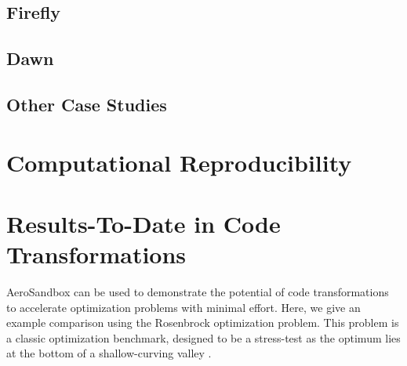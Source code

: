 
\subsection{Firefly} %

\subsection{Dawn} %

\subsection{Other Case Studies} %


\section{Computational Reproducibility}
\label{sec:asb-reproducibility}


\section{Results-To-Date in Code Transformations}



AeroSandbox can be used to demonstrate the potential of code transformations to accelerate optimization problems with minimal effort. Here, we give an example comparison using the Rosenbrock optimization problem. This problem is a classic optimization benchmark, designed to be a stress-test as the optimum lies at the bottom of a shallow-curving valley \cite{rosenbrock}.